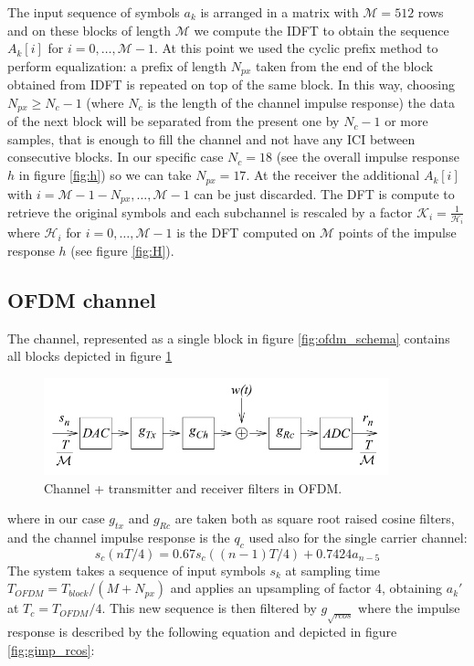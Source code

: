 \documentclass[a4paper,11.5pt]{article}
\begin{document}
The input sequence of symbols $a_k$ is arranged in a matrix with $\mathcal{M}=512$ rows and on these blocks of length $\mathcal{M}$ we compute the IDFT to obtain the sequence $A_k[i]$ for $i=0,\dots , \mathcal{M}-1$. At this point we used the cyclic prefix method to perform equalization: a prefix of length $N_{px}$ taken from the end of the block obtained from IDFT is repeated on top of the same block. In this way, choosing $N_{px}\geq N_c-1$ (where $N_c$ is the length of the channel impulse response) the data of the next block will be separated from the present one by $N_c-1$ or more samples, that is enough to fill the channel and not have any ICI between consecutive blocks. In our specific case $N_c=18$ (see the overall impulse response $h$ in figure \ref{fig:h}) so we can take $N_{px}=17$.
 At the receiver the additional $A_k[i]$ with $i=\mathcal{M}-1-N_{px},\dots ,\mathcal{M}-1$ can be just discarded. The DFT is compute to retrieve the original symbols and each subchannel is rescaled by a factor $\mathcal{K}_i = \frac{1}{\mathcal{H}_i}$ where $\mathcal{H}_i$ for $i=0, \dots, \mathcal{M}-1$ is the DFT  computed on $\mathcal{M}$ points of the impulse response $h$ (see figure \ref{fig:H}).

\subsection*{OFDM channel}

The channel, represented as a single block in figure \ref{fig:ofdm_schema} contains all blocks depicted in figure \ref{fig:ofdm_channel_schema}

\begin{figure}[H]
	\begin{center}   
		\includegraphics[width=10cm]{figs/OFDM_channel_schema.png} 
		\caption{Channel + transmitter and receiver filters in OFDM.}
		\label{fig:ofdm_channel_schema}
	\end{center}
\end{figure}

where in our case $g_{tx}$ and $g_{Rc}$ are taken both as square root raised cosine filters, and the channel impulse response is the $q_c$ used also for the single carrier channel: 
\begin{equation}\label{eq:q_c}
s_c(nT/4) = 0.67 s_c((n-1)T/4) + 0.7424 a_{n-5}
\end{equation}
The system takes a sequence of input symbols $s_k$ at sampling time $T_{OFDM}=T_{block}/(M + N_{px})$ and applies an upsampling of factor 4, obtaining $a_k'$ at $T_c = T_{OFDM}/4$. This new sequence is then filtered by $g_{\sqrt{rcos}}$ where the impulse response is described by the following equation and depicted in figure \ref{fig:gimp_rcos}:
\end{document}
